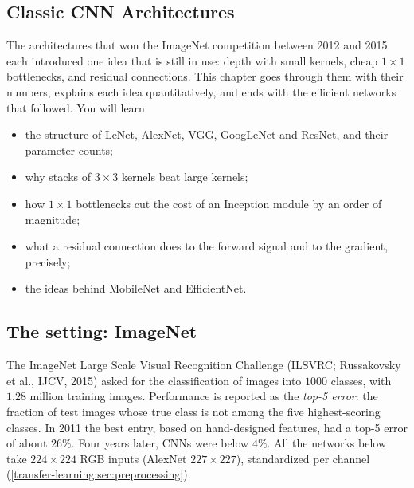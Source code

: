 \begin{notechapter}
\chapter{Classic CNN Architectures}\label{ch:cnn-architectures}

\begin{chapterintro}
The architectures that won the ImageNet competition between 2012 and 2015 each
introduced one idea that is still in use: depth with small kernels, cheap $1\times1$
bottlenecks, and residual connections. This chapter goes through them with their numbers,
explains each idea quantitatively, and ends with the efficient networks that followed. You
will learn
\begin{itemize}[nosep]
  \item the structure of LeNet, AlexNet, VGG, GoogLeNet and ResNet, and their parameter
        counts;
  \item why stacks of $3\times3$ kernels beat large kernels;
  \item how $1\times1$ bottlenecks cut the cost of an Inception module by an order of magnitude;
  \item what a residual connection does to the forward signal and to the gradient, precisely;
  \item the ideas behind MobileNet and EfficientNet.
\end{itemize}
\end{chapterintro}

\section{The setting: ImageNet}\label{cnn-architectures:sec:imagenet}

The ImageNet Large Scale Visual Recognition Challenge (ILSVRC; Russakovsky et al., IJCV,
2015) asked for the classification of images into $1000$ classes, with $1.28$ million training images.
Performance is reported as the \emph{top-5 error}: the fraction of test images whose true class is
not among the five highest-scoring classes. In 2011 the best entry, based on hand-designed
features, had a top-5 error of about $26\%$. Four years later, CNNs were below $4\%$. All the networks
below take $224\times224$ RGB inputs (AlexNet $227\times227$), standardized per channel
(\cref{transfer-learning:sec:preprocessing}).


\end{notechapter}

